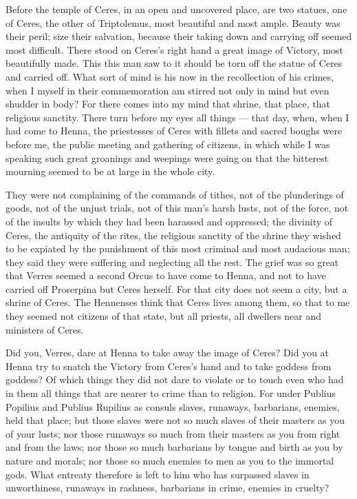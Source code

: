  Before the temple of Ceres, in an open and uncovered place, are two statues, one of Ceres, the other of Triptolemus, most beautiful and most ample. Beauty was their peril; size their salvation, because their taking down and carrying off seemed most difficult. There stood on Ceres's right hand a great image of Victory, most beautifully made. This this man saw to it should be torn off the statue of Ceres and carried off. What sort of mind is his now in the recollection of his crimes, when I myself in their commemoration am stirred not only in mind but even shudder in body? For there comes into my mind that shrine, that place, that religious sanctity. There turn before my eyes all things --- that day, when, when I had come to Henna, the priestesses of Ceres with fillets and sacred boughs were before me, the public meeting and gathering of citizens, in which while I was speaking such great groanings and weepings were going on that the bitterest mourning seemed to be at large in the whole city.

 They were not complaining of the commands of tithes, not of the plunderings of goods, not of the unjust trials, not of this man's harsh lusts, not of the force, not of the insults by which they had been harassed and oppressed; the divinity of Ceres, the antiquity of the rites, the religious sanctity of the shrine they wished to be expiated by the punishment of this most criminal and most audacious man; they said they were suffering and neglecting all the rest. The grief was so great that Verres seemed a second Orcus to have come to Henna, and not to have carried off Proserpina but Ceres herself. For that city does not seem a city, but a shrine of Ceres. The Hennenses think that Ceres lives among them, so that to me they seemed not citizens of that state, but all priests, all dwellers near and ministers of Ceres.

 Did you, Verres, dare at Henna to take away the image of Ceres? Did you at Henna try to snatch the Victory from Ceres's hand and to take goddess from goddess? Of which things they did not dare to violate or to touch even who had in them all things that are nearer to crime than to religion. For under Publius Popilius and Publius Rupilius as consuls slaves, runaways, barbarians, enemies, held that place; but those slaves were not so much slaves of their masters as you of your lusts; nor those runaways so much from their masters as you from right and from the laws; nor those so much barbarians by tongue and birth as you by nature and morals; nor those so much enemies to men as you to the immortal gods. What entreaty therefore is left to him who has surpassed slaves in unworthiness, runaways in rashness, barbarians in crime, enemies in cruelty?

